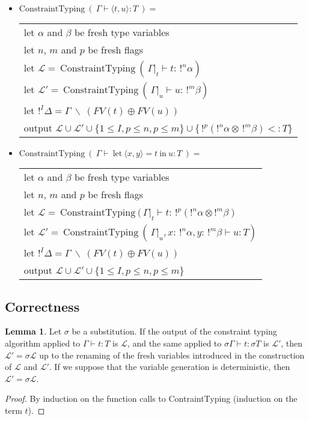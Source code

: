 \documentclass[9pt]{article}
\theoremstyle{plain}
\theoremstyle{definition}
\newtheorem{lemma}{Lemma}[section]
\newcommand{\pair}[2]{\langle #1, #2 \rangle}
\begin{document}
\begin{itemize}
		\item $\text{ConstraintTyping} ~ (~ \Gamma \vdash \pair{t}{u} : T ~) = $ \\
			\begin{tabular}{l}
				let $\alpha$ and $\beta$ be fresh type variables \\
				let $n$, $m$ and $p$ be fresh flags \\
				let $\mathcal{L} = ~ \text{ConstraintTyping} ~ ( \, \Gamma|_t \vdash t : \, !^n\alpha)$ \\
				let $\mathcal{L'} = ~ \text{ConstraintTyping} ~ ( \, \Gamma|_u \vdash u : \, !^m\beta)$ \\
				let $!^I\Delta = \Gamma ~ \backslash ~ (FV(t) \oplus FV(u))$ \\
				output $\mathcal{L \cup L'} \cup \{ 1 \le I, p \le n, p \le m \} \cup \{ \, !^p (!^n \alpha \otimes \, !^m \beta) <: T\}$
			\end{tabular}
			
		\item $\text{ConstraintTyping} ~ (~ \Gamma \vdash ~\text{let}~ \pair{x}{y} = t ~\text{in}~ u : T ~) = $ \\
			\begin{tabular}{l}
				let $\alpha$ and $\beta$ be fresh type variables \\
				let $n$, $m$ and $p$ be fresh flags \\
				let $\mathcal{L} = ~ \text{ConstraintTyping} ~ ( \, \Gamma|_t \vdash t : \, !^p(!^n \alpha \otimes !^m \beta)$ \\
				let $\mathcal{L'} = ~ \text{ConstraintTyping} ~ ( \, \Gamma|_u, x : \,!^n \alpha, y : \,!^m \beta \vdash u : T)$ \\
				let $!^I\Delta = \Gamma ~ \backslash ~ (FV(t) \oplus FV(u))$ \\
				output $\mathcal{L \cup L'} \cup \{ 1 \le I, p \le n, p \le m \}$
			\end{tabular}
	\end{itemize}
	
\subsection{Correctness}

\begin{lemma}
	\label{tau-context}
	Let $\sigma$ be a substitution. If the output of the constraint typing algorithm applied to $\Gamma \vdash t : T$ is $\mathcal{L}$,
	and the same applied to $\sigma \Gamma \vdash t : \sigma T$ is $\mathcal{L'}$,
	then $\mathcal{L'} = \sigma \mathcal{L}$ up to the renaming of the fresh variables introduced in the construction of $\mathcal{L}$ and
	$\mathcal{L'}$. If we suppose that the variable generation is deterministic, then $\mathcal{L'} = \sigma \mathcal{L}$.
	
	\begin{proof}
		By induction on the function calls to ContraintTyping (induction on the term $t$).
	\end{proof}
\end{lemma}
\end{document}
